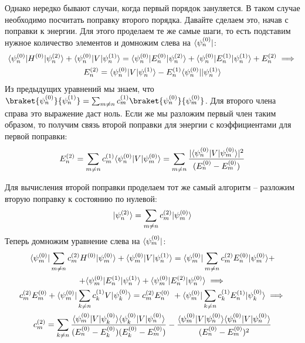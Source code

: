 Однако нередко бывают случаи, когда первый порядок зануляется. В таком случае
необходимо посчитать поправку второго порядка. Давайте сделаем это, начав с
поправки к энергии. Для этого проделаем те же самые шаги, то есть подставим
нужное количество элементов и домножим слева на $\langle\psi^{(0)}_n\rvert$:
\begin{gather*}
  \langle\psi^{(0)}_n\rvert H^{(0)}\lvert\psi^{(2)}_n\rangle + \langle\psi^{(0)}_n\rvert V\lvert\psi^{(1)}_n\rangle = \langle\psi^{(0)}_n\rvert E^{(0)}_n\lvert\psi^{(2)}_n\rangle + \langle\psi^{(0)}_n\rvert E^{(1)}_n\lvert\psi^{(1)}_n\rangle + E^{(2)}_n \implies\\
  E^{(2)}_n = \langle\psi^{(0)}_n\rvert V\lvert\psi^{(1)}_n\rangle -E^{(1)}_n\langle\psi^{(0)}_n\rvert\lvert\psi^{(1)}_n\rangle
\end{gather*}
Из предыдущих уравнений мы знаем, что
$\braket{\psi^{(0)}_n}{\psi^{(1)}_n}=\sum_{m\neq n} c^{(1)}_{m}
  \braket{\psi^{(0)}_n}{\psi^{(0)}_m}$. Для второго члена справа это выражение
даст ноль. Если же мы разложим первый член таким образом, то получим связь
второй поправки для энергии с коэффициентами для первой поправки:
\[
  E^{(2)}_n = \sum\limits_{m\neq n}c^{(1)}_{m}\langle\psi^{(0)}_n\rvert V\lvert\psi^{(0)}_m\rangle = \sum\limits_{m\neq n}\frac{|\langle\psi^{(0)}_n\rvert V\lvert\psi^{(0)}_m\rangle|^2}{(E^{(0)}_n - E^{(0)}_m)}
\]

Для вычисления второй поправки проделаем тот же самый алгоритм – разложим
вторую поправку к состоянию по нулевой:
\[
  \lvert\psi^{(2)}_n\rangle = \sum\limits_{m\neq n}c^{(2)}_m\lvert\psi^{(0)}_m\rangle
\]
Теперь домножим уравнение слева на $\langle\psi^{(0)}_m\rvert$:
\begin{gather*}
  \langle\psi^{(0)}_m\rvert\sum\limits_{m\neq n}c^{(2)}_mH^{(0)}\lvert\psi^{(0)}_m\rangle + \langle\psi^{(0)}_m\rvert V\lvert\psi^{(1)}_n\rangle = \langle\psi^{(0)}_m\rvert\sum\limits_{m\neq n}c^{(2)}_mE^{(0)}_n\lvert\psi^{(0)}_m\rangle + \\
  + \langle\psi^{(0)}_m\rvert E^{(1)}_n\lvert\psi^{(1)}_n\rangle + \langle\psi^{(0)}_m\rvert E^{(2)}_n\lvert\psi^{(0)}_n\rangle \implies \\
  c^{(2)}_mE^{(0)}_m + \langle\psi^{(0)}_m\rvert\sum\limits_{k\neq n}c^{(1)}_k V\lvert\psi^{(0)}_k\rangle = c^{(2)}_mE^{(0)}_n\ + \langle\psi^{(0)}_m\rvert\sum\limits_{k\neq n}c^{(1)}_kE^{(1)}_n\lvert\psi^{(0)}_k\rangle\implies \\
  c^{(2)}_{m} = \sum\limits_{k\neq n} \frac{\langle\psi^{(0)}_m\rvert V\lvert\psi^{(0)}_k\rangle \langle\psi^{(0)}_k\rvert V\lvert\psi^{(0)}_n\rangle} {(E^{(0)}_n - E^{(0)}_k)(E^{(0)}_k - E^{(0)}_m)}-\frac{\langle\psi^{(0)}_m\rvert V\lvert\psi^{(0)}_n\rangle \langle\psi^{(0)}_n\rvert V\lvert\psi^{(0)}_n\rangle}{(E^{(0)}_n - E^{(0)}_m)^2}
\end{gather*}

